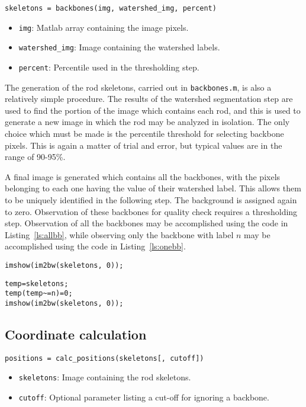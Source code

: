 \texttt{skeletons = backbones(img, watershed\_img, percent)}

\begin{itemize}
\item \texttt{img}: Matlab array containing the image pixels.
\item \texttt{watershed\_img}: Image containing the watershed labels.
\item \texttt{percent}: Percentile used in the thresholding step.
\end{itemize}

The generation of the rod skeletons, carried out in \texttt{backbones.m}, is also a relatively simple
procedure.  The results of the watershed segmentation step are used to find the portion of the 
image which contains each rod, and this is used to generate a new image in which the rod may
be analyzed in isolation. The only choice which must be made is the percentile threshold for selecting 
backbone pixels. This is again a matter of trial and error, but typical values are in the range of 90-95\%.

A final image is generated which contains all the backbones, with the pixels belonging to each one having
the value of their watershed label. This allows them to be uniquely identified in the following step. The background is 
assigned again to zero.  Observation of these backbones for quality check requires a thresholding step. Observation
of all the backbones may be accomplished using the code in Listing~\ref{ls:allbb}, while observing only the backbone 
with label $n$ may be accomplished using the code in Listing~\ref{ls:onebb}.

\begin{lstlisting}[label=ls:allbb,caption=Show all backbones as an image]
imshow(im2bw(skeletons, 0));
\end{lstlisting}

\begin{lstlisting}[label=ls:onebb,caption=Show only backbone with label $n$]
temp=skeletons;
temp(temp~=n)=0;
imshow(im2bw(skeletons, 0));
\end{lstlisting}

\subsection{Coordinate calculation}

\texttt{positions = calc\_positions(skeletons[, cutoff])}

\begin{itemize}
\item \texttt{skeletons}: Image containing the rod skeletons.
\item \texttt{cutoff}: Optional parameter listing a cut-off for ignoring a backbone.
\end{itemize}

